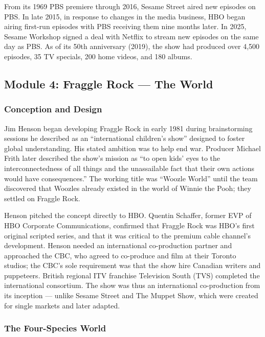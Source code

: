 \documentclass[11pt,letterpaper]{article}
\begin{document}
From its 1969 PBS premiere through 2016, Sesame Street aired new episodes on PBS. In late 2015, in response to changes in the media business, HBO began airing first-run episodes with PBS receiving them nine months later. In 2025, Sesame Workshop signed a deal with Netflix to stream new episodes on the same day as PBS. As of its 50th anniversary (2019), the show had produced over 4,500 episodes, 35 TV specials, 200 home videos, and 180 albums.

\subsection{Module 4: Fraggle Rock --- The World}

\subsubsection{Conception and Design}

Jim Henson began developing Fraggle Rock in early 1981 during brainstorming sessions he described as an ``international children's show'' designed to foster global understanding. His stated ambition was to help end war. Producer Michael Frith later described the show's mission as ``to open kids' eyes to the interconnectedness of all things and the unassailable fact that their own actions would have consequences.'' The working title was ``Woozle World'' until the team discovered that Woozles already existed in the world of Winnie the Pooh; they settled on Fraggle Rock.

Henson pitched the concept directly to HBO. Quentin Schaffer, former EVP of HBO Corporate Communications, confirmed that Fraggle Rock was HBO's first original scripted series, and that it was critical to the premium cable channel's development. Henson needed an international co-production partner and approached the CBC, who agreed to co-produce and film at their Toronto studios; the CBC's sole requirement was that the show hire Canadian writers and puppeteers. British regional ITV franchise Television South (TVS) completed the international consortium. The show was thus an international co-production from its inception --- unlike Sesame Street and The Muppet Show, which were created for single markets and later adapted.

\subsubsection{The Four-Species World}
\end{document}

